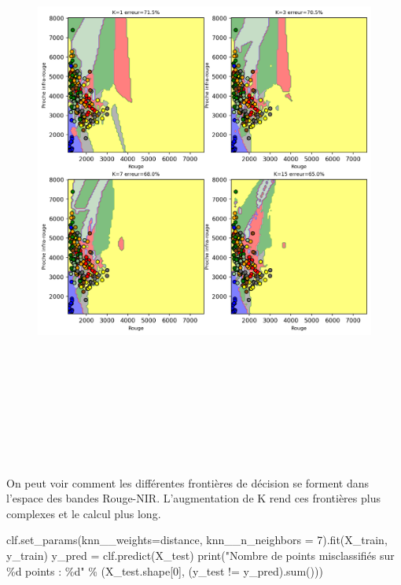 \documentclass[
]{article}
\newenvironment{Shaded}{}{}
\newcommand{\BuiltInTok}[1]{\textcolor[rgb]{0.00,0.50,0.00}{#1}}
\newcommand{\DecValTok}[1]{\textcolor[rgb]{0.25,0.63,0.44}{#1}}
\newcommand{\NormalTok}[1]{#1}
\newcommand{\OperatorTok}[1]{\textcolor[rgb]{0.40,0.40,0.40}{#1}}
\newcommand{\SpecialCharTok}[1]{\textcolor[rgb]{0.25,0.44,0.63}{#1}}
\newcommand{\StringTok}[1]{\textcolor[rgb]{0.25,0.44,0.63}{#1}}
\begin{document}
\begin{figure}
\centering
\includegraphics[width=7.78125in,height=7.6875in]{05-ClassificationsSupervisees_files/figure-html/cell-27-output-2.png}
\caption{}
\end{figure}

On peut voir comment les différentes frontières de décision se forment
dans l'espace des bandes Rouge-NIR. L'augmentation de K rend ces
frontières plus complexes et le calcul plus long.

\label{e3b879e0}
\label{cb29}
\begin{Shaded}
\begin{Highlighting}[]
\NormalTok{clf.set\_params(knn\_\_weights}\OperatorTok{=}\StringTok{\textquotesingle{}distance\textquotesingle{}}\NormalTok{, knn\_\_n\_neighbors }\OperatorTok{=} \DecValTok{7}\NormalTok{).fit(X\_train, y\_train)}
\NormalTok{y\_pred }\OperatorTok{=}\NormalTok{ clf.predict(X\_test)}
\BuiltInTok{print}\NormalTok{(}\StringTok{"Nombre de points misclassifiés sur }\SpecialCharTok{\%d}\StringTok{ points : }\SpecialCharTok{\%d}\StringTok{"}
  \OperatorTok{\%}\NormalTok{ (X\_test.shape[}\DecValTok{0}\NormalTok{], (y\_test }\OperatorTok{!=}\NormalTok{ y\_pred).}\BuiltInTok{sum}\NormalTok{()))}
\end{Highlighting}
\end{Shaded}
\end{document}
